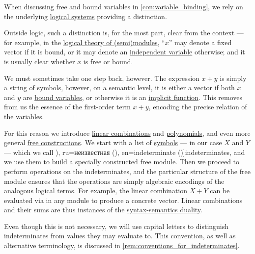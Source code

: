 \begin{concept}\label{con:indeterminate}
  When discussing free and bound variables in \cref{con:variable_binding}, we rely on the underlying \hyperref[con:logical_system]{logical systems} providing a distinction.

  Outside logic, such a distinction is, for the most part, clear from the context --- for example, in the \hyperref[def:semimodule/theory]{logical theory of (semi)modules}, \enquote{\( x \)} may denote a fixed vector if it is bound, or it may denote an \hyperref[con:variable_dependence]{independent variable} otherwise; and it is usually clear whether \( x \) is free or bound.

  We must sometimes take one step back, however. The expression \( x + y \) is simply a string of symbols, however, on a semantic level, it is either a vector if both \( x \) and \( y \) are \hyperref[con:variable_binding]{bound variables}, or otherwise it is an \hyperref[con:variable_dependence]{implicit function}. This removes from us the essence of the first-order term \( x + y \), encoding the precise relation of the variables.

  For this reason we introduce \hyperref[def:linear_combination]{linear combinations} and \hyperref[def:polynomial_algebra]{polynomials}, and even more general \hyperref[con:free_construction]{free constructions}. We start with a list of \hyperref[def:formal_language/symbol]{symbols} --- in our case \( X \) and \( Y \) --- which we call \term[bg=неизвестно (\cite[405]{Обрешков1962ВисшаАлгебра}), ru=неизвестная (\cite[131]{Курош1968КурсВысшейАлгебры}), en=indeterminate (\cite[def. III.1.19]{Aluffi2009Algebra})]{indeterminates}, and we use them to build a specially constructed free module. Then we proceed to perform operations on the indeterminates, and the particular structure of the free module ensures that the operations are simply algebraic encodings of the analogous logical terms. For example, the linear combination \( X + Y \) can be evaluated via  in any module to produce a concrete vector. Linear combinations and their sums are thus instances of the \hyperref[con:syntax_semantics_duality]{syntax-semantics duality}.

  Even though this is not necessary, we will use capital letters to distinguish indeterminates from values they may evaluate to. This convention, as well as alternative terminology, is discussed in \cref{rem:conventions_for_indeterminates}.
\end{concept}

